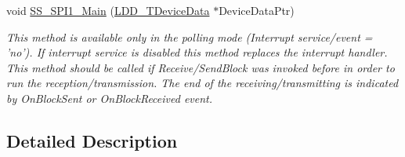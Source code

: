 \begin{DoxyCompactItemize}
void \hyperlink{group___s_s___s_p_i1__module_ga791549a3c993814fc03f19149793b89a}{S\-S\-\_\-\-S\-P\-I1\-\_\-\-Main} (\hyperlink{group___p_e___types__module_gac5cf1362f1f0e3a2ce71b1bf2276d091}{L\-D\-D\-\_\-\-T\-Device\-Data} $\ast$Device\-Data\-Ptr)
\begin{DoxyCompactList}\small\item\em This method is available only in the polling mode (Interrupt service/event = 'no'). If interrupt service is disabled this method replaces the interrupt handler. This method should be called if Receive/\-Send\-Block was invoked before in order to run the reception/transmission. The end of the receiving/transmitting is indicated by On\-Block\-Sent or On\-Block\-Received event. \end{DoxyCompactList}\end{DoxyCompactItemize}


\subsection{Detailed Description}


